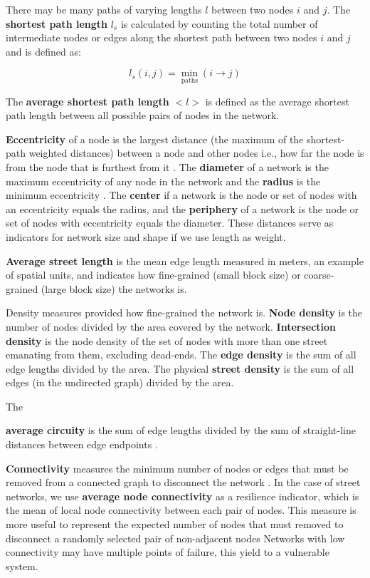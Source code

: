 There may be many paths of varying lengths $l$ between two nodes $i$ and $j$. The \textbf{shortest path length} $l_s$ is calculated by counting the total number of intermediate nodes or edges along the shortest path between two nodes $i$ and $j$ and is defined as:

\begin{equation} \label{eq:5}
	l_s(i,j) = \min_\text{paths}({i \to j})
\end{equation}

The \textbf{average shortest path length} $<l>$ is defined as the average shortest path length between all possible pairs of nodes in the network. {\textbf{Eccentricity} of a node is the largest distance (the maximum of the shortest-path weighted distances) between a node and other nodes i.e., how far the node is from the node that is furthest from it \cite{urban-keitt_2001}. The \textbf{diameter} of a network is the maximum eccentricity of any node in the network and the \textbf{radius} is the minimum eccentricity \cite{hage-harary_1995}. The \textbf{center} if a network is the node or set of nodes with an eccentricity equals the radius, and the \textbf{periphery} of a network is the node or set of nodes with eccentricity equals the diameter. These distances serve as indicators for network size and shape if we use length as weight.

\textbf{Average street length} is the mean edge length measured in meters, an example of spatial units, and indicates how fine-grained (small block size) or coarse-grained (large block size) the networks is.

Density measures provided how fine-grained the network is. \textbf{Node density} is the number of nodes divided by the area covered by the network. \textbf{Intersection density} is the node density of the set of nodes with more than one street emanating from them, excluding dead-ends. The \textbf{edge density} is the sum of all edge lengths divided by the area. The physical \textbf{street density} is the sum of all edges (in the undirected graph) divided by the area.

The {\textbf{average circuity} is the sum of edge lengths divided by the sum of straight-line distances between edge endpoints \cite{giacomin-levinson_2015}.

\textbf{Connectivity} measures the minimum number of nodes or edges that must be removed from a connected graph to disconnect the network \cite{urban-keitt_2001}. In the case of street networks, we use \textbf{average node connectivity} as a resilience indicator, which is the mean of local node connectivity between each pair of nodes. This measure is more useful to represent the expected number of nodes that must removed to disconnect a randomly selected pair of non-adjacent nodes \cite{beineke-oellermann-pippert_2002, dankelmann-oellermann_2003} Networks with low connectivity may have multiple points of failure, this yield to a vulnerable system. 

}}
